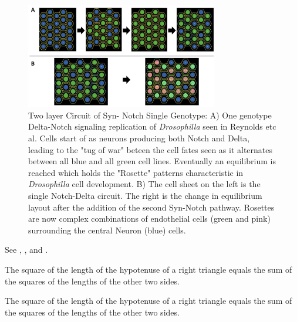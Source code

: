 \begin{figure}
\begin{center}
\includegraphics[width=8.4cm]{One_Genotype_two_and_one_SynNotch}    %
\caption{Two layer Circuit of Syn- Notch Single Genotype: A) One genotype Delta-Notch signaling replication of \emph{Drosophilla} seen in Reynolds etc al. Cells start of as neurons producing both Notch and Delta, leading to the "tug of war" beteen the cell fates seen as it alternates between all blue and all green cell lines. Eventually an equilibrium is reached which holds the "Rosette" patterns characteristic in \emph{Drosophilla} cell development.  B) The cell sheet on the left is the single Notch-Delta circuit. The right is the change in equilibrium layout after the addition of the second Syn-Notch pathway. Rosettes are now complex combinations of endothelial cells (green and pink) surrounding the central Neuron (blue) cells. } 
\label{fig:bifurcation}
\end{center}
\end{figure}



See \cite{Abl:56}, \cite{AbTaRu:54}, \cite{Keo:58} and \cite{Pow:85}.



\begin{thm}   %
The square of the length of the hypotenuse of a right triangle equals
the sum of the squares of the lengths of the other two sides.
\end{thm}

\begin{pf}    %
The square of the length of the hypotenuse of a right triangle equals the sum of the squares 
of the lengths of the other two sides.
\end{pf}

